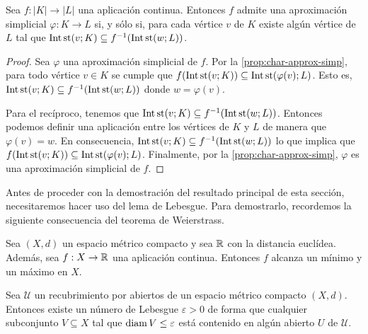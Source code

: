 \begin{corolario}
	\label{cor:char-approx-simp}
	Sea $f: |K| \to |L|$ una aplicación continua. Entonces $f$ admite una aproximación simplicial $\varphi : K \to L$ si, y sólo si, para cada vértice $v$ de $K$ existe algún vértice de $L$ tal que $\operatorname{Int} \operatorname{st}(v;K) \subseteq f^{-1}(\operatorname{Int} \operatorname{st}(w;L))$.
\end{corolario}
\begin{proof}
	Sea $\varphi$ una aproximación simplicial de $f$. Por la \autoref{prop:char-approx-simp}, para todo vértice $v \in K$ se cumple que $f(\operatorname{Int} \operatorname{st}(v;K)) \subseteq \operatorname{Int} \operatorname{st}(\varphi(v);L)$. Esto es, $\operatorname{Int} \operatorname{st}(v;K) \subseteq f^{-1}(\operatorname{Int} \operatorname{st}(w;L))$ donde $w = \varphi(v)$.
	
	Para el recíproco, tenemos que $\operatorname{Int} \operatorname{st}(v;K) \subseteq f^{-1}(\operatorname{Int} \operatorname{st}(w;L))$. Entonces podemos definir una aplicación entre los vértices de $K$ y $L$ de manera que $\varphi(v) = w$. En consecuencia, $\operatorname{Int} \operatorname{st}(v;K) \subseteq f^{-1}(\operatorname{Int} \operatorname{st}(w;L))$ lo que implica que $f(\operatorname{Int} \operatorname{st}(v;K)) \subseteq \operatorname{Int} \operatorname{st}(\varphi(v);L)$. Finalmente, por la \autoref{prop:char-approx-simp}, $\varphi$ es una aproximación simplicial de $f$.
\end{proof}

Antes de proceder con la demostración del resultado principal de esta sección, necesitaremos hacer uso del lema de Lebesgue. Para demostrarlo, recordemos la siguiente consecuencia del teorema de Weierstrass.

\begin{corolario}
	\label{cor:teo-weierstrass}
	Sea $(X,d)$ un espacio métrico compacto y sea $\mathbb{R}$ con la distancia euclídea. Además, sea $f: X \to \mathbb{R}$ una aplicación continua. Entonces $f$ alcanza un mínimo y un máximo en $X$.
\end{corolario}
\begin{lema}
	\label{lem:lebesgue}
	Sea \(\mathcal{U}\) un recubrimiento por abiertos de un espacio métrico compacto \((X,d)\). Entonces existe un número de Lebesgue \(\varepsilon > 0\) de forma que cualquier subconjunto \(V \subseteq X\) tal que \(\operatorname{diam} V \leq \varepsilon\) está contenido en algún abierto \(U\) de \(\mathcal{U}\).
\end{lema}

